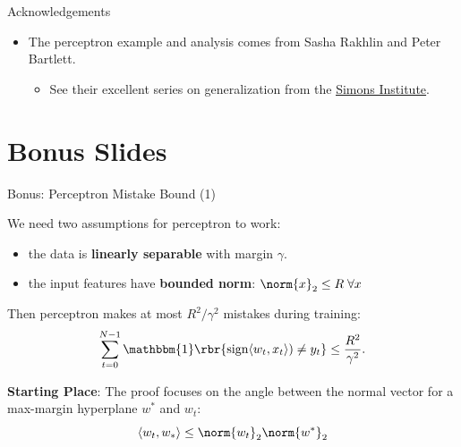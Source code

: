 \documentclass[notheorems]{beamer}
\begin{document}
    \begin{frame}{Acknowledgements}

        \begin{itemize}
            \item The perceptron example and analysis comes from Sasha Rakhlin and Peter Bartlett.
            \begin{itemize}
                \item See their excellent series on generalization from the \href{https://simons.berkeley.edu/workshops/schedule/10624}{\color{blue} \underline{Simons Institute}}.
            \end{itemize}
        \end{itemize}

    \end{frame}


    \section{Bonus Slides}

    \begin{frame}{Bonus: Perceptron Mistake Bound (1)}

        \begin{theorem}
            We need two assumptions for perceptron to work:
            \begin{itemize}
                \item the data is \textbf{linearly separable} with margin $\gamma$.
                \item the input features have \textbf{bounded norm}: $\norm{x}_2 \leq R \; \forall x$
            \end{itemize}
            Then perceptron makes at most $R^2 / \gamma^2$ mistakes during training:
                \[ \sum_{t=0}^{N-1} \mathbbm{1}\rbr{\text{sign}\langle w_t, x_t \rangle) \neq y_t} \leq \frac{R^2}{\gamma^2}. \]

        \end{theorem}

        \textbf{Starting Place}: The proof focuses on the angle between the normal vector for a max-margin hyperplane $w^*$ and $w_t$:
        \[ \langle w_t, w_* \rangle \leq \norm{w_t}_2 \norm{w^*}_2  \]

    \end{frame}
\end{document}
